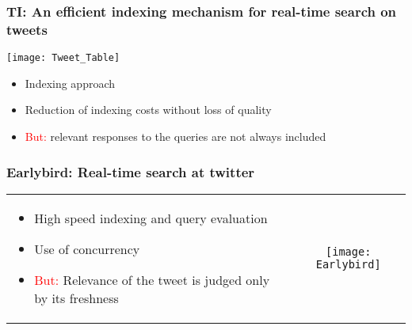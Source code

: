 \documentclass[11pt]{beamer}
\begin{document}
	
	\begin{frame}
		\frametitle{TI: An efficient indexing mechanism for real-time search on tweets}
        \texttt{[image: Tweet\_Table]}
        \begin{itemize}
			\item
            	Indexing approach
            \item
            	Reduction of indexing costs without loss of quality
            \item
            	\textcolor{red}{But:} relevant responses to the queries are not always included
        \end{itemize}
	\end{frame}
	
    
	
	\begin{frame}
		\frametitle{Earlybird: Real-time search at twitter}
           \begin{table}[h!]
             \begin{center}
               \begin{tabular}{ p{5cm}  c }
                  \begin{minipage}{5cm}
                    \begin{itemize}
                      \item High speed indexing and query evaluation
                      \item Use of concurrency
                      \item \textcolor{red}{But:} Relevance of the tweet is judged only by its freshness
                    \end{itemize}
                  \end{minipage}
                  &
                  \begin{minipage}{.5\textwidth}
                    \texttt{[image: Earlybird]}
                  \end{minipage}
                \end{tabular}
              \end{center}
            \end{table}
	\end{frame}
	
\end{document}

